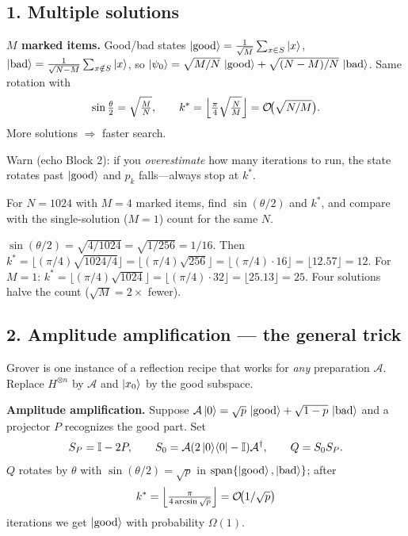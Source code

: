 \documentclass[11pt]{article}
\begin{document}
\subsection*{1. Multiple solutions }
\begin{board}
\textbf{$M$ marked items.} Good/bad states
$\ket{\mathrm{good}}=\tfrac1{\sqrt M}\sum_{x\in S}\ket x$,
$\ket{\mathrm{bad}}=\tfrac1{\sqrt{N-M}}\sum_{x\notin S}\ket x$, so
$\ket{\psi_0}=\sqrt{M/N}\,\ket{\mathrm{good}}+\sqrt{(N-M)/N}\,\ket{\mathrm{bad}}$.
Same rotation with
\[
  \sin\tfrac\theta2=\sqrt{\tfrac MN},\qquad
  k^\ast=\Big\lfloor\tfrac\pi4\sqrt{\tfrac NM}\Big\rfloor=\mathcal{O}\!\big(\sqrt{N/M}\big).
\]
More solutions $\Rightarrow$ faster search.
\end{board}

Warn (echo Block 2): if you \emph{overestimate} how many iterations to run, the
state rotates past $\ket{\mathrm{good}}$ and $p_k$ falls---always stop at $k^\ast$.

\begin{inclass}\label{ic:l3-M}
For $N=1024$ with $M=4$ marked items, find $\sin(\theta/2)$ and $k^\ast$, and
compare with the single-solution ($M=1$) count for the same $N$.
\end{inclass}
\begin{answer}
$\sin(\theta/2)=\sqrt{4/1024}=\sqrt{1/256}=1/16$. Then
$k^\ast=\lfloor(\pi/4)\sqrt{1024/4}\rfloor=\lfloor(\pi/4)\sqrt{256}\rfloor
=\lfloor(\pi/4)\cdot16\rfloor=\lfloor12.57\rfloor=12$. For $M=1$:
$k^\ast=\lfloor(\pi/4)\sqrt{1024}\rfloor=\lfloor(\pi/4)\cdot32\rfloor
=\lfloor25.13\rfloor=25$. Four solutions halve the count ($\sqrt M=2\times$ fewer). \checkmark
\end{answer}

\subsection*{2. Amplitude amplification --- the general trick }
Grover is one instance of a reflection recipe that works for \emph{any} preparation
$\mathcal A$. Replace $H^{\otimes n}$ by $\mathcal A$ and $\ket{x_0}$ by the good
subspace.

\begin{board}
\textbf{Amplitude amplification.} Suppose
$\mathcal A\ket0=\sqrt{p}\,\ket{\mathrm{good}}+\sqrt{1-p}\,\ket{\mathrm{bad}}$ and a
projector $P$ recognizes the good part. Set
\[
  S_P=\mathbb{I}-2P,\qquad S_0=\mathcal A(2\ket{0}\!\bra{0}-\mathbb{I})\mathcal A^{\dagger},\qquad Q=S_0S_P.
\]
$Q$ rotates by $\theta$ with $\sin(\theta/2)=\sqrt p$ in
$\operatorname{span}\{\ket{\mathrm{good}},\ket{\mathrm{bad}}\}$; after
\[
  k^\ast=\Big\lfloor\tfrac{\pi}{4\arcsin\sqrt p}\Big\rfloor=\mathcal{O}\!\big(1/\sqrt p\big)
\]
iterations we get $\ket{\mathrm{good}}$ with probability $\Omega(1)$.
\end{board}
\end{document}

